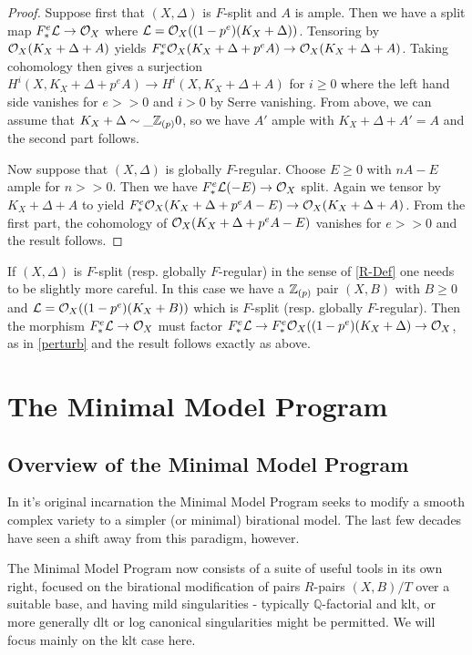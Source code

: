 \begin{proof}
	
	Suppose first that $(X,\Delta)$ is $F$-split and $A$ is ample. Then we have a split map $F^{e}_{*} \mathcal{L} \to \mathcal{O}_{X}$ where $\mathcal{L}=\mathcal{O}_{X}((1-p^{e})(K_{X}+\Delta))$. Tensoring by $\mathcal{O}_{X}(K_{X}+\Delta+A)$ yields $F^{e}_{*}\mathcal{O}_{X}(K_{X}+\Delta+p^{e}A) \to \mathcal{O}_{X}(K_{X}+\Delta+A)$. Taking cohomology then gives a surjection $H^{i}(X,K_{X}+\Delta+p^{e}A) \to H^{i}(X,K_{X}+\Delta+A)$ for $i \geq 0$ where the left hand side vanishes for $e>>0$ and $i>0$ by Serre vanishing. From above, we can assume that $K_{X}+\Delta\sim\_{\mathbb{Z}_{(p)}} 0$, so we have $A'$ ample with $K_{X}+\Delta+A'=A$ and the second part follows.
	
	Now suppose that $(X,\Delta)$ is globally $F$-regular. Choose $E\geq 0$ with $nA-E$ ample for $n>>0$. Then we have $F^{e}_{*}\mathcal{L}(-E) \to \mathcal{O}_{X}$ split. Again we tensor by $K_{X}+\Delta+A$ to yield $F^{e}_{*} \mathcal{O}_{X}(K_{X}+\Delta+p^{e}A-E) \to \mathcal{O}_{X}(K_{X}+\Delta+A)$. From the first part, the cohomology of $\mathcal{O}_{X}(K_{X}+\Delta+p^{e}A-E)$ vanishes for $e>>0$ and the result follows.
		
\end{proof}

If $(X,\Delta)$ is $F$-split (resp. globally $F$-regular) in the sense of \autoref{R-Def} one needs to be slightly more careful. In this case we have a $\mathbb{Z}_{(p)}$ pair $(X,B)$ with $B \geq 0$ and $\mathcal{L}=\mathcal{O}_{X}((1-p^{e})(K_{X}+B))$ which is $F$-split (resp. globally $F$-regular). Then the morphism $F^{e}_{*} \mathcal{L} \to \mathcal{O}_{X}$ must factor $F^{e}_{*} \mathcal{L} \to F^{e}_{*}\mathcal{O}_{X}((1-p^{e})(K_{X}+\Delta) \to \mathcal{O}_{X}$, as in \autoref{perturb} and the result follows exactly as above.

\section{The Minimal Model Program}

\subsection{Overview of the Minimal Model Program}\label{overview}
In it's original incarnation the Minimal Model Program seeks to modify a smooth complex variety to a simpler (or minimal) birational model. The last few decades have seen a shift away from this paradigm, however. 

The Minimal Model Program now consists of a suite of useful tools in its own right, focused on the birational modification of pairs $R$-pairs $(X,B)/T$ over a suitable base, and having mild singularities - typically $\mathbb{Q}$-factorial and klt, or more generally dlt or log canonical singularities might be permitted. We will focus mainly on the klt case here.

